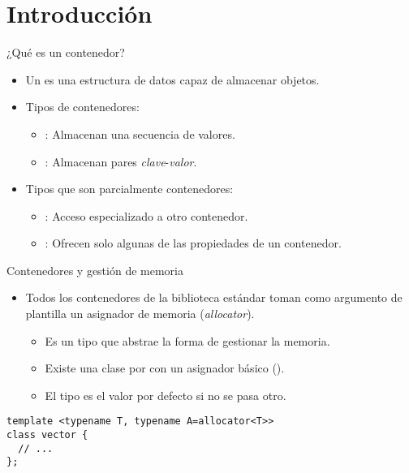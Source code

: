 \section{Introducción}

\begin{frame}[t]{¿Qué es un contenedor?}
\begin{itemize}
  \item Un  es una estructura de datos capaz de almacenar objetos.
  \vfill\pause
  \item Tipos de contenedores:
    \begin{itemize}
      \item {}: Almacenan una secuencia de valores.
      \item {}: Almacenan pares \emph{clave}-\emph{valor}.
    \end{itemize}
  \vfill\pause
  \item Tipos que son parcialmente contenedores:
    \begin{itemize}
      \item {}: Acceso especializado a otro contenedor.
      \item {}: Ofrecen solo algunas de las propiedades de un contenedor.
    \end{itemize}
\end{itemize}
\end{frame}

\begin{frame}[t,fragile]{Contenedores y gestión de memoria}
\begin{itemize}
  \item Todos los contenedores de la biblioteca estándar toman como argumento de plantilla
        un asignador de memoria (\emph{allocator}).
    \begin{itemize}
      \item Es un tipo  que abstrae la forma de gestionar la memoria.
      \item Existe una clase por con un asignador básico ().
      \item El tipo  es el valor por defecto si no se pasa otro.
    \end{itemize}
\end{itemize}
\vfill
\begin{lstlisting}
template <typename T, typename A=allocator<T>>
class vector {
  // ...
};
\end{lstlisting}
\end{frame}

